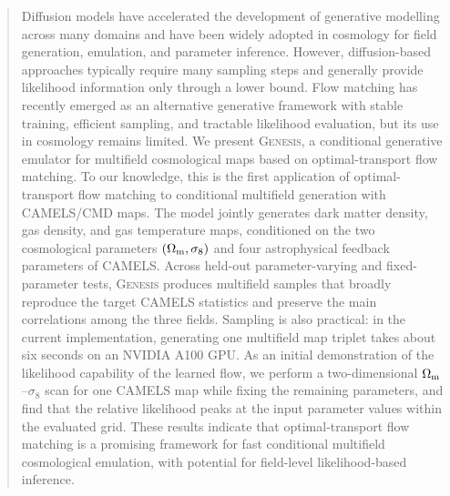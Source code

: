 \documentclass[usenatbib]{mnras}
\newcommand{\Om}{\Omega_{\rm m}}
\newcommand{\sig}{\sigma_8}
\begin{document}
\begin{abstract}
Diffusion models have accelerated the development of generative
modelling across many domains and have been widely adopted in
cosmology for field generation, emulation, and parameter inference.
However, diffusion-based approaches typically require many sampling
steps and generally provide likelihood information only through a
lower bound. Flow matching has recently emerged as an alternative
generative framework with stable training, efficient sampling, and
tractable likelihood evaluation, but its use in cosmology remains
limited. We present \textsc{Genesis}, a conditional generative
emulator for multifield cosmological maps based on optimal-transport
flow matching. To our knowledge, this is the first application of
optimal-transport flow matching to conditional multifield generation
with CAMELS/CMD maps. The model jointly generates dark matter
density, gas density, and gas temperature maps, conditioned on the two
cosmological parameters $(\Omega_{\rm m},\sigma_8)$ and four
astrophysical feedback parameters of CAMELS. Across held-out
parameter-varying and fixed-parameter tests, \textsc{Genesis}
produces multifield samples that broadly reproduce the target CAMELS
statistics and preserve the main correlations among the three fields.
Sampling is also practical: in the current implementation, generating
one multifield map triplet takes about six seconds on an NVIDIA A100
GPU. As an initial demonstration of the likelihood capability of the
learned flow, we perform a two-dimensional $\Omega_{\rm m}$--$\sigma_8$
scan for one CAMELS map while fixing the remaining parameters, and
find that the relative likelihood peaks at the input parameter values
within the evaluated grid. These results indicate that
optimal-transport flow matching is a promising framework for fast
conditional multifield cosmological emulation, with potential for
field-level likelihood-based inference.
\end{abstract}
\end{document}

